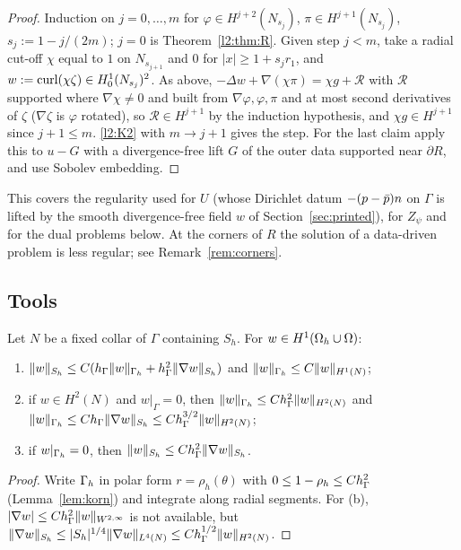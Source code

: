 \begin{proof}
Induction on $j=0,\dots,m$ for $\varphi\in H^{j+2}(N_{s_j})$, $\pi\in H^{j+1}(N_{s_j})$, $s_j:=1-j/(2m)$; $j=0$ is Theorem~\ref{l2:thm:R}. Given step $j<m$, take a radial cut-off $\chi$ equal to $1$ on $N_{s_{j+1}}$ and $0$ for $|x|\ge1+s_jr_1$, and $w:=\operatorname{curl}(\chi\zeta)\in H^1_0(N_{s_j})^2$. As above, $-\Delta w+\nabla(\chi\pi)=\chi g+\mathcal R$ with $\mathcal R$ supported where $\nabla\chi\ne0$ and built from $\nabla\varphi,\varphi,\pi$ and at most second derivatives of $\zeta$ ($\nabla\zeta$ is $\varphi$ rotated), so $\mathcal R\in H^{j+1}$ by the induction hypothesis, and $\chi g\in H^{j+1}$ since $j+1\le m$. \ref{l2:K2} with $m\to j+1$ gives the step. For the last claim apply this to $u-G$ with a divergence-free lift $G$ of the outer data supported near $\partial R$, and use Sobolev embedding.
\end{proof}

This covers the regularity used for $U$ (whose Dirichlet datum $-(p-\bar p)n$ on $\Gamma$ is lifted by the smooth divergence-free field $w$ of Section~\ref{sec:printed}), for $Z_\psi$ and for the dual problems below. At the corners of $R$ the solution of a data-driven problem is less regular; see Remark~\ref{rem:corners}.

\subsection{Tools}

\begin{lemma}[Strip]\label{l2:strip}
Let $N$ be a fixed collar of $\Gamma$ containing $S_h$. For $w\in H^1(\Omega_h\cup\Omega)$:
\begin{enumerate}[label=(\alph*)]
\item $\lVert w\rVert_{S_h}\le C(h_\Gamma\lVert w\rVert_{\Gamma_h}+h_\Gamma^2\lVert \nabla w\rVert_{S_h})$ and $\lVert w\rVert_{\Gamma_h}\le C\lVert w\rVert_{H^1(N)}$;
\item if $w\in H^2(N)$ and $w|_\Gamma=0$, then $\lVert w\rVert_{\Gamma_h}\le Ch_\Gamma^2\lVert w\rVert_{H^2(N)}$ and $\lVert w\rVert_{\Gamma_h}\le Ch_\Gamma\lVert \nabla w\rVert_{S_h}\le Ch_\Gamma^{3/2}\lVert w\rVert_{H^2(N)}$;
\item if $w|_{\Gamma_h}=0$, then $\lVert w\rVert_{S_h}\le Ch_\Gamma^2\lVert \nabla w\rVert_{S_h}$.
\end{enumerate}
\end{lemma}

\begin{proof}
Write $\Gamma_h$ in polar form $r=\rho_h(\theta)$ with $0\le1-\rho_h\le Ch_\Gamma^2$ (Lemma~\ref{lem:korn}) and integrate along radial segments. For (b), $|\nabla w|\le Ch_\Gamma^2\lVert w\rVert_{W^{2,\infty}}$ is not available, but $\lVert \nabla w\rVert_{S_h}\le|S_h|^{1/4}\lVert \nabla w\rVert_{L^4(N)}\le Ch_\Gamma^{1/2}\lVert w\rVert_{H^2(N)}$.
\end{proof}

